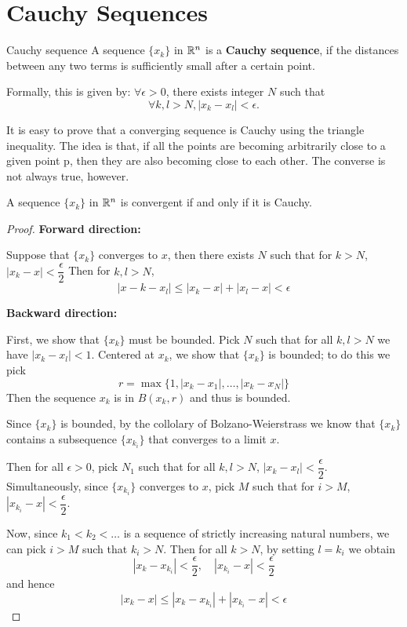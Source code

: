 \section{Cauchy Sequences}
\begin{defn}{Cauchy sequence}{}
A sequence $\{x_k\}$ in $\mathbb R^n$ is a \textbf{Cauchy sequence}, if the distances between any two terms is sufficiently small after a certain point.

Formally, this is given by: $\forall \epsilon>0$, there exists integer $N$ such that 
\[ \forall k,l>N, |x_k-x_l|<\epsilon. \]
\end{defn}

It is easy to prove that a converging sequence is Cauchy using the triangle inequality. The idea is that, if all the points are becoming arbitrarily close to a given point p, then they are also becoming close to each other. The converse is not always true, however.

\begin{lemma}
A sequence $\{x_k\}$ in $\mathbb R^n$ is convergent if and only if it is Cauchy.
\end{lemma}

\begin{proof}
\textbf{Forward direction:}

Suppose that $\{x_k\}$ converges to $x$, then there exists $N$ such that for $k>N$, $|x_k-x|<\dfrac{\epsilon}{2}$
Then for $k,l>N$, 
\[ |x-k-x_l| \le |x_k-x|+|x_l-x| < \epsilon \]

\textbf{Backward direction:}

First, we show that $\{x_k\}$ must be bounded. 
Pick $N$ such that for all $k,l>N$ we have $|x_k-x_l|<1$. 
Centered at $x_k$, we show that $\{x_k\}$ is bounded; to do this we pick
\[ r = \max\{1,|x_k-x_1|,\dots,|x_k-x_N|\} \]
Then the sequence ${x_k}$ is in $B(x_k,r)$ and thus is bounded.

Since $\{x_k\}$ is bounded, by the collolary of Bolzano-Weierstrass we know that $\{x_k\}$ contains a subsequence $\{x_{k_i}\}$ that converges to a limit $x$.

Then for all $\epsilon>0$, pick $N_1$ such that for all $k,l>N$, $|x_k-x_l|<\dfrac{\epsilon}{2}$. 
Simultaneously, since $\{x_{k_i}\}$ converges to $x$, pick $M$ such that for $i>M$, $|x_{k_i}-x|<\dfrac{\epsilon}{2}$.

Now, since $k_1<k_2<\dots$ is a sequence of strictly increasing natural numbers, we can pick $i>M$ such that $k_i>N$. Then for all $k>N$, by setting $l=k_i$ we obtain
\[ |x_k-x_{k_i}| < \frac{\epsilon}{2}, \quad |x_{k_i}-x| < \frac{\epsilon}{2} \]
and hence
\[ |x_k-x| \le |x_k-x_{k_i}|+|x_{k_i}-x| < \epsilon \]
\end{proof}

